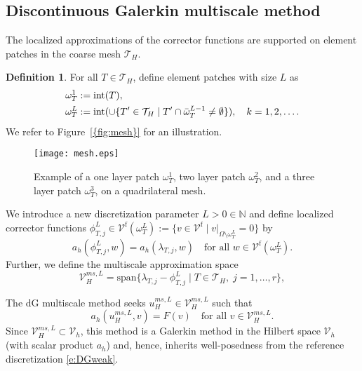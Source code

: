 \documentclass[10pt]{article}
\numberwithin{equation}{section}
\theoremstyle{plain}
\theoremstyle{definition}
\newtheorem{definition}[theorem]{Definition}
\theoremstyle{remark}
\begin{document}
\subsection{Discontinuous Galerkin multiscale method}
The localized approximations of the corrector functions are supported on element patches in the coarse mesh ${\mathcal{T}}_H$.
\begin{definition} For all $T\in{\mathcal{T}}_H $, define element patches with size $L$ as
  \begin{equation}\notag
    \begin{aligned}
      \omega^1_T & := \text{int}(T), \\
      \omega^{L}_T & := \text{int}(\cup\{T'\in {\mathcal{T}}_H\;\vert\; T'\cap\bar{\omega}_T^{L-1}\neq\emptyset\}),\quad k=1,2,\ldots .
    \end{aligned}
  \end{equation}
  We refer to {Figure~\ref{{fig:mesh}}} for an illustration.
\end{definition}
\begin{figure}\label{fig:mesh}
  \centering
  \texttt{[image: mesh.eps]}
  \caption{Example of a one layer patch $\omega^1_T$, two layer patch $\omega^2_T$, and a three layer patch $\omega^3_T$, on a quadrilateral mesh.}
\end{figure}
We introduce a new discretization parameter $L>0\in\mathbb{N}$ and define localized corrector functions $\phi^L_{T,j}\in{\mathcal{V}^{\operatorname*{f}}}(\omega^L_T):=\{v\in{\mathcal{V}}^{\operatorname*{f}} \mid v|_{\Omega\setminus\omega^L_T}=0\}$ by
\begin{equation}\label{eq:corrector}
  a_h(\phi^L_{T,j},w) = a_h(\lambda_{T,j},w)\quad \text{for all }w\in{\mathcal{V}^{\operatorname*{f}}}(\omega^L_T).
\end{equation}
Further, we define the multiscale approximation space
\begin{equation*}
 {\mathcal{V}^{ms,L}_{H}}=\text{span}\{\lambda_{T,j}-\phi^L_{T,j}\;\vert\; T\in{\mathcal{T}}_H,\;j=1,\ldots,r\},
\end{equation*}

The dG multiscale method seeks ${u^{ms,L}_{H}}\in{\mathcal{V}^{ms,L}_{H}}$ such that
\begin{equation}\label{eq:DGMM}
  {a_h({u^{ms,L}_{H}},{v})} = F(v)\quad \text{for all }v\in{\mathcal{V}^{ms,L}_{H}}.
\end{equation}
Since ${\mathcal{V}^{ms,L}_{H}}\subset {\mathcal{V}_h}$, this method is a Galerkin method in the Hilbert space ${\mathcal{V}_h}$ (with scalar product $a_h$) and, hence, inherits well-posedness from the reference discretization \eqref{e:DGweak}.
\end{document}
